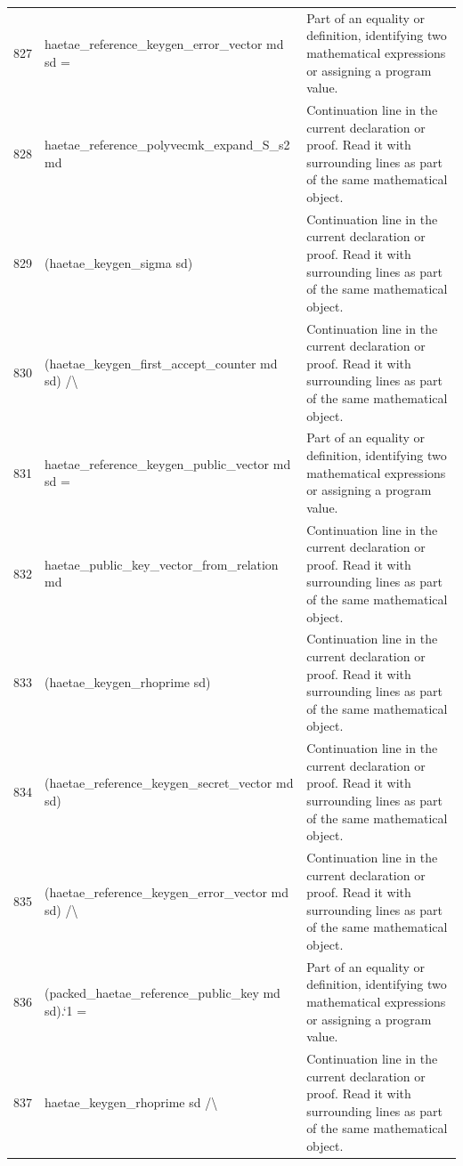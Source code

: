 \documentclass[10pt]{article}
\begin{document}
\begin{longtable}{r L{0.53\textwidth} L{0.37\textwidth}}
827 & {\ttfamily\scriptsize   haetae\_reference\_keygen\_error\_vector md sd =} & Part of an equality or definition, identifying two mathematical expressions or assigning a program value. \\
828 & {\ttfamily\scriptsize     haetae\_reference\_polyvecmk\_expand\_S\_s2 md} & Continuation line in the current declaration or proof.  Read it with surrounding lines as part of the same mathematical object. \\
829 & {\ttfamily\scriptsize       (haetae\_keygen\_sigma sd)} & Continuation line in the current declaration or proof.  Read it with surrounding lines as part of the same mathematical object. \\
830 & {\ttfamily\scriptsize       (haetae\_keygen\_first\_accept\_counter md sd) /\textbackslash{}} & Continuation line in the current declaration or proof.  Read it with surrounding lines as part of the same mathematical object. \\
831 & {\ttfamily\scriptsize   haetae\_reference\_keygen\_public\_vector md sd =} & Part of an equality or definition, identifying two mathematical expressions or assigning a program value. \\
832 & {\ttfamily\scriptsize     haetae\_public\_key\_vector\_from\_relation md} & Continuation line in the current declaration or proof.  Read it with surrounding lines as part of the same mathematical object. \\
833 & {\ttfamily\scriptsize       (haetae\_keygen\_rhoprime sd)} & Continuation line in the current declaration or proof.  Read it with surrounding lines as part of the same mathematical object. \\
834 & {\ttfamily\scriptsize       (haetae\_reference\_keygen\_secret\_vector md sd)} & Continuation line in the current declaration or proof.  Read it with surrounding lines as part of the same mathematical object. \\
835 & {\ttfamily\scriptsize       (haetae\_reference\_keygen\_error\_vector md sd) /\textbackslash{}} & Continuation line in the current declaration or proof.  Read it with surrounding lines as part of the same mathematical object. \\
836 & {\ttfamily\scriptsize   (packed\_haetae\_reference\_public\_key md sd).`1 =} & Part of an equality or definition, identifying two mathematical expressions or assigning a program value. \\
837 & {\ttfamily\scriptsize     haetae\_keygen\_rhoprime sd /\textbackslash{}} & Continuation line in the current declaration or proof.  Read it with surrounding lines as part of the same mathematical object. \\

\end{longtable}
\end{document}
